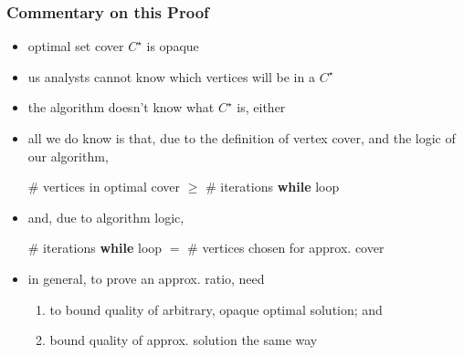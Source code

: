 \documentclass{beamer}
\begin{document}
\begin{frame} \frametitle{Commentary on this Proof}
\begin{itemize}
  \item optimal set cover $C^\star$ is opaque
  \item us analysts cannot know which vertices will be in a $C^\star$
  \item the algorithm doesn't know what $C^\star$ is, either
  \item all we do know is that, due to the definition of vertex cover, and
    the logic of our algorithm,
    \begin{center}
      \# vertices in optimal cover $\geq$ \# iterations \textbf{while} loop
    \end{center}
  \item and, due to algorithm logic,
  \begin{center}
      \# iterations \textbf{while} loop $=$ \# vertices chosen for approx. cover
  \end{center}
  \item in general, to prove an approx. ratio, need
  \begin{enumerate}
    \item to bound quality of arbitrary, opaque optimal solution; and
    \item bound quality of approx. solution the same way
  \end{enumerate}
\end{itemize}
\end{frame}
\end{document}
